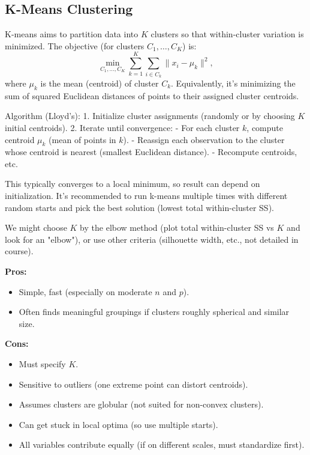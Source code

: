 \documentclass[11pt]{article}
\begin{document}
\subsection{K-Means Clustering}
K-means aims to partition data into $K$ clusters so that within-cluster variation is minimized. The objective (for clusters $C_1, \ldots, C_K$) is:
\[ \min_{C_1,\ldots,C_K} \sum_{k=1}^K \sum_{i \in C_k} \|x_i - \mu_k\|^2, \]
where $\mu_k$ is the mean (centroid) of cluster $C_k$. Equivalently, it's minimizing the sum of squared Euclidean distances of points to their assigned cluster centroids.

Algorithm (Lloyd's):
1. Initialize cluster assignments (randomly or by choosing $K$ initial centroids).
2. Iterate until convergence:
   - For each cluster $k$, compute centroid $\mu_k$ (mean of points in $k$).
   - Reassign each observation to the cluster whose centroid is nearest (smallest Euclidean distance).
   - Recompute centroids, etc.

This typically converges to a local minimum, so result can depend on initialization. It's recommended to run k-means multiple times with different random starts and pick the best solution (lowest total within-cluster SS).

We might choose $K$ by the elbow method (plot total within-cluster SS vs $K$ and look for an "elbow"), or use other criteria (silhouette width, etc., not detailed in course).

\noindent \textbf{Pros:}
\begin{itemize}
    \item Simple, fast (especially on moderate $n$ and $p$).
    \item Often finds meaningful groupings if clusters roughly spherical and similar size.
\end{itemize}

\noindent \textbf{Cons:}
\begin{itemize}
    \item Must specify $K$.
    \item Sensitive to outliers (one extreme point can distort centroids).
    \item Assumes clusters are globular (not suited for non-convex clusters).
    \item Can get stuck in local optima (so use multiple starts).
    \item All variables contribute equally (if on different scales, must standardize first).
\end{itemize}
\end{document}
